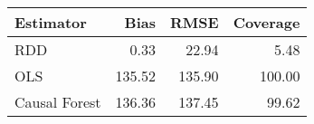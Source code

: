 \begin{table}[ht]
\centering
\begin{tabular}{lrrr}
  \hline
Estimator & Bias & RMSE & Coverage \\ 
  \hline
RDD & 0.33 & 22.94 & 5.48 \\ 
  OLS & 135.52 & 135.90 & 100.00 \\ 
  Causal Forest & 136.36 & 137.45 & 99.62 \\ 
   \hline
\end{tabular}
\end{table}
